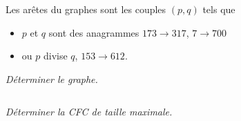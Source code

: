 Les arêtes du graphes sont les couples $(p, q)$ tels que 
\begin{itemize}
    \item $p$ et $q$ sont des anagrammes $173 \rightarrow 317$, $7 \rightarrow 700$
    \item ou $p$ divise $q$, $153 \rightarrow 612$.
\end{itemize}
\begin{Exercise}\it 
Déterminer le graphe.
\end{Exercise} 
\begin{Answer}
\begin{lstlisting}
\end{lstlisting}
\end{Answer} 
\begin{Exercise}\it 
Déterminer la CFC de taille maximale.
\end{Exercise} 
\begin{Answer}
\begin{lstlisting}
\end{lstlisting}
\end{Answer} 






